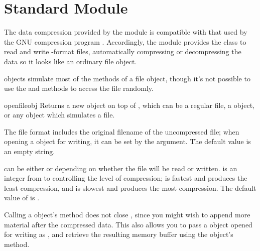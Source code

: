 \section{Standard Module }
\label{module-gzip}

The data compression provided by the  module is compatible
with that used by the GNU compression program .
Accordingly, the  module provides the 
class to read and write -format files, automatically
compressing or decompressing the data so it looks like an ordinary
file object.

 objects simulate most of the methods of a file
object, though it's not possible to use the  and
 methods to access the file randomly.


\begin{funcdesc}{open}{fileobj}
  Returns a new  object on top of , which
  can be a regular file, a  object, or any object which
  simulates a file.

  The  file format includes the original filename of the
  uncompressed file; when opening a  object for
  writing, it can be set by the  argument.  The default
  value is an empty string.

   can be either  or  depending on
  whether the file will be read or written.   is an
  integer from  to  controlling the level of
  compression;  is fastest and produces the least compression,
  and  is slowest and produces the most compression.  The
  default value of  is .

  Calling a  object's  method does not
  close , since you might wish to append more material
  after the compressed data.  This also allows you to pass a
   object opened for writing as , and
  retrieve the resulting memory buffer using the 
  object's  method.
\end{funcdesc}

\begin{seealso}
\end{seealso}

